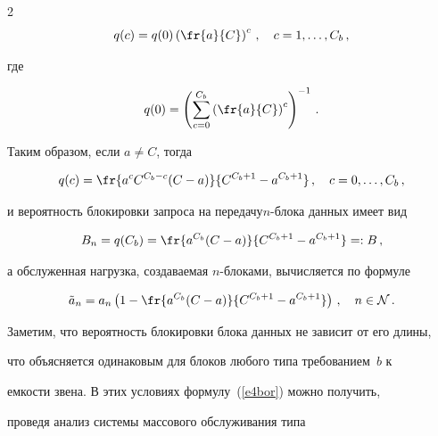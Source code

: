 \begin{multicols}{2}
  \begin{equation}


  q(c) = q(0) \left (\fr{a}{C}\right )^c\,, \quad c=1,\ldots ,C_b\,,


  \label{e2bor}


  \end{equation}


где


\begin{equation}


q(0) =  \left ( \sum\limits_{c=0}^{C_b} \left (\fr{a}{C}\right )^c\right )^{-1}\,.


\label{e3bor}


\end{equation}


  


  Таким образом, если $a\not= C$, тогда


  $$


  q(c) = \fr{a^c C^{C_b-c} (C-a)}{C^{C_b+1} -a^{C_b+1}}\,,\quad c=0,\ldots 


,C_b\,,


  $$


и вероятность блокировки запроса на передачу\linebreak $n$-бло\-ка данных имеет вид


\begin{equation}


B_n = q(C_b) =\fr{a^{C_b} (C-a)}{C^{C_b+1} -a^{C_b+1}} =: B\,,


\label{e4bor}


\end{equation}


а обслуженная нагрузка, создаваемая $n$-блоками, вычисляется по формуле


$$


\tilde{a}_n = a_n\left ( 1-\fr{a^{C_b} (C-a)}{C^{C_b+1} -a^{C_b+1}}\right 


)\,,\quad n\in {\mathcal N}\,.


$$


  


  Заметим, что вероятность блокировки блока данных не зависит от его длины, 


что объясняется одинаковым для блоков любого типа требованием~$b$ к 


емкости звена. В этих условиях формулу~(\ref{e4bor}) можно получить, 


проведя анализ системы массового обслуживания типа 



\end{multicols}
